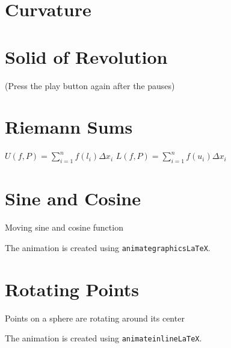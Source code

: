 \documentclass[12pt]{article}
\begin{document}
\begin{center}

\end{center}						

\newpage

\section{Curvature}

\begin{center}

\end{center}

\section{Solid of Revolution}

\begin{center}


(Press the play button again after the pauses)
\end{center}

\newpage

\section{Riemann Sums}

$U(f,P)=\displaystyle \sum_{i=1}^n f(l_i)\Delta x_i$\newline
$L(f,P)=\displaystyle \sum_{i=1}^n f(u_i)\Delta x_i$

\begin{center}

\end{center}

\newpage

\section{Sine and Cosine}
Moving sine and cosine function
\begin{center}

\end{center}
The animation is created using \texttt{animategraphicsLaTeX}.

\section{Rotating Points}
Points on a sphere are rotating around its center
\begin{center}

\end{center}
The animation is created using \texttt{animateinlineLaTeX}.
\end{document}
